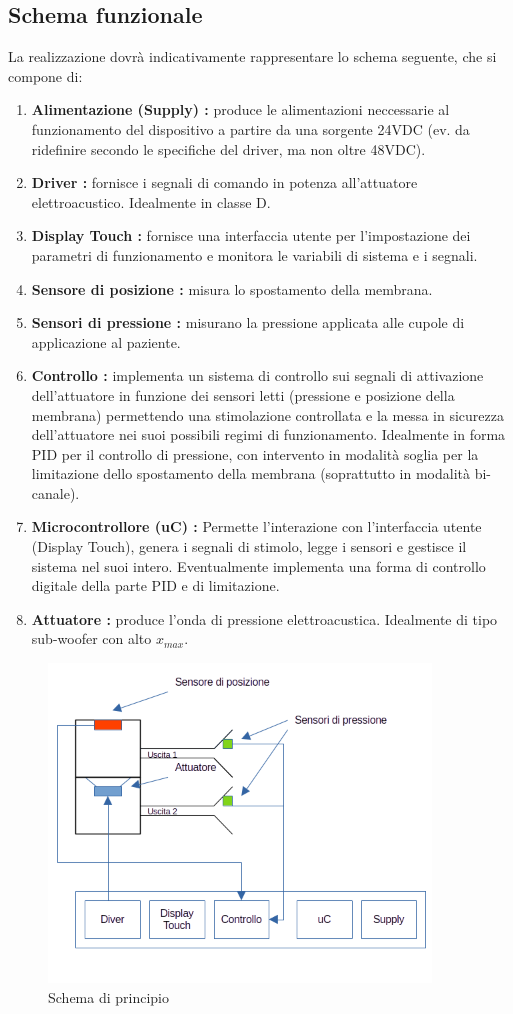 \documentclass[lettersize,journal,onecolumn]{IEEEtran}
\begin{document}
\subsection{Schema funzionale}
\noindent La realizzazione dovrà indicativamente rappresentare lo schema seguente, che si compone di:
\begin{enumerate}{}{}
\item \textbf{Alimentazione (Supply) :} produce le alimentazioni neccessarie al funzionamento del dispositivo a partire da una sorgente 24VDC (ev. da ridefinire secondo le specifiche del driver, ma non oltre 48VDC).
\item \textbf{Driver :} fornisce i segnali di comando in potenza all'attuatore elettroacustico. Idealmente in classe D.
\item \textbf{Display Touch :} fornisce una interfaccia utente per l'impostazione dei parametri di funzionamento e monitora le variabili di sistema e i segnali.
\item \textbf{Sensore di posizione :} misura lo spostamento della membrana.
\item \textbf{Sensori di pressione :} misurano la pressione applicata alle cupole di applicazione al paziente.
\item \textbf{Controllo :} implementa un sistema di controllo sui segnali di attivazione dell'attuatore in funzione dei sensori letti (pressione e posizione della membrana) permettendo una stimolazione controllata e la messa in sicurezza dell'attuatore nei suoi possibili regimi di funzionamento. Idealmente in forma PID per il controllo di pressione, con intervento in modalità soglia per la limitazione dello spostamento della membrana (soprattutto in modalità bi-canale). 
\item \textbf{Microcontrollore (uC) :} Permette l'interazione con l'interfaccia utente (Display Touch), genera i segnali di stimolo, legge i sensori e gestisce il sistema nel suoi intero. Eventualmente implementa una forma di controllo digitale della parte PID e di limitazione.
\item \textbf{Attuatore :} produce l'onda di pressione elettroacustica. Idealmente di tipo sub-woofer con alto $x_{max}$.
\end{enumerate}

\begin{figure}[!t]
\centering
\includegraphics[width=4in]{figA}
\caption{Schema di principio}
\label{figA}
\end{figure}
\end{document}
